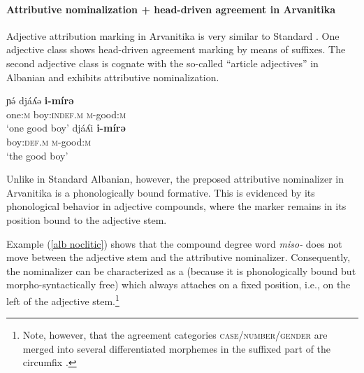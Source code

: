 \paragraph*{Attributive nominalization + head\hyp{}driven agreement in Arvanitika}
Adjective attribution marking in Arvanitika is very similar to Standard . One adjective class shows head\hyp{}driven agreement marking by means of suffixes. The second adjective class is cognate with the so-called “article adjectives” in Albanian and exhibits attributive nominalization. 
\begin{exe}
\begin{xlist}
\ex
\gll	ɲə́ 			djáʎə 			\textbf{i-mírə}\\
	one:\textsc{m} 	boy:\textsc{indef.m} 	\textsc{m}-good:\textsc{m}\\
\glt	‘one good boy’
\ex
\gll				djáʎi 				\textbf{i-mírə}\\
				boy:\textsc{def.m} 	\textsc{m}-good:\textsc{m}\\
\glt	‘the good boy’
\end{xlist}
\end{exe}
Unlike in Standard Albanian, however, the preposed attributive nominalizer in Arvanitika is a phonologically bound formative. This is evidenced by its phonological behavior in adjective compounds, where the marker remains in its position bound to the adjective stem.
\begin{exe}
\label{alb noclitic}
\begin{xlist}
\end{xlist}
\end{exe}
Example (\ref{alb noclitic}) shows that the compound degree word \textit{miso-} does not move between the adjective stem and the attributive nominalizer. Consequently, the nominalizer can be characterized as a  (because it is phonologically bound but morpho-syntactically free) which always attaches on a fixed position, i.e., on the left of the adjective stem.\footnote{Note, however, that the agreement categories \textsc{case/number/gender} are merged into several differentiated morphemes in the suffixed part of the circumfix \citep[124–128]{sasse1991}.}

